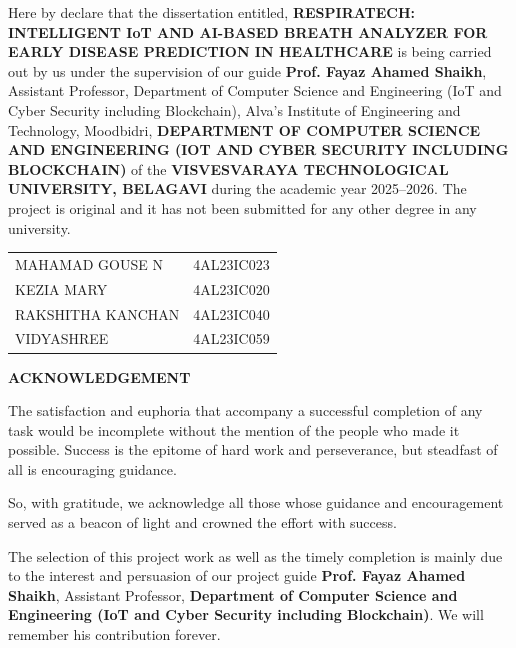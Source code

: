 \documentclass[12pt,a4paper]{report}
\begin{document}
Here by declare that the dissertation entitled, {\color{darkred}\textbf{RESPIRATECH: INTELLIGENT IoT AND AI-BASED BREATH ANALYZER FOR EARLY DISEASE PREDICTION IN HEALTHCARE}} is being carried out by us under the supervision of our guide \textbf{Prof. Fayaz Ahamed Shaikh}, Assistant Professor, {\color{darkblue}Department of Computer Science and Engineering (IoT and Cyber Security including Blockchain)}, {\color{darkblue}Alva's Institute of Engineering and Technology, Moodbidri}, \textbf{DEPARTMENT OF COMPUTER SCIENCE AND ENGINEERING (IOT AND CYBER SECURITY INCLUDING BLOCKCHAIN)} of the \textbf{VISVESVARAYA TECHNOLOGICAL UNIVERSITY, BELAGAVI} during the academic year 2025--2026. The project is original and it has not been submitted for any other degree in any university.

\vspace{2cm}
\begin{center}
\begin{tabular}{l r}
MAHAMAD GOUSE N & 4AL23IC023 \\
KEZIA MARY & 4AL23IC020 \\
RAKSHITHA KANCHAN & 4AL23IC040 \\
VIDYASHREE & 4AL23IC059 \\
\end{tabular}
\end{center}
\newpage

\thispagestyle{empty}
\begin{center}
\textbf{\Large ACKNOWLEDGEMENT}\\[0.5cm]
\end{center}

The satisfaction and euphoria that accompany a successful completion of any task would be incomplete without the mention of the people who made it possible. Success is the epitome of hard work and perseverance, but steadfast of all is encouraging guidance.

\vspace{0.5cm}
So, with gratitude, we acknowledge all those whose guidance and encouragement served as a beacon of light and crowned the effort with success.

\vspace{0.5cm}
The selection of this project work as well as the timely completion is mainly due to the interest and persuasion of our project guide \textbf{Prof. Fayaz Ahamed Shaikh}, Assistant Professor, \textbf{Department of Computer Science and Engineering (IoT and Cyber Security including Blockchain)}. We will remember his contribution forever.
\end{document}
